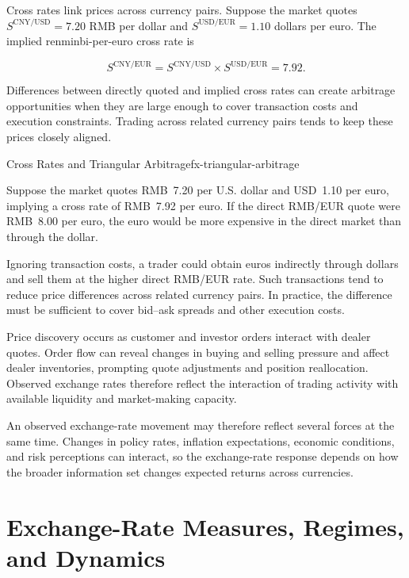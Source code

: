 Cross rates link prices across currency pairs. Suppose the market quotes $S^{\mathrm{CNY/USD}}=7.20$ RMB per dollar and $S^{\mathrm{USD/EUR}}=1.10$ dollars per euro. The implied renminbi-per-euro cross rate is

\begin{equation*}
S^{\mathrm{CNY/EUR}}
=S^{\mathrm{CNY/USD}}\times
S^{\mathrm{USD/EUR}}
=7.92.
\label{eq:ch10-cross-rate}
\end{equation*}

Differences between directly quoted and implied cross rates can create arbitrage opportunities when they are large enough to cover transaction costs and execution constraints. Trading across related currency pairs tends to keep these prices closely aligned.

\begin{example}{Cross Rates and Triangular Arbitrage}{fx-triangular-arbitrage}

Suppose the market quotes RMB~7.20 per U.S. dollar and USD~1.10 per euro, implying a cross rate of RMB~7.92 per euro. If the direct RMB/EUR quote were RMB~8.00 per euro, the euro would be more expensive in the direct market than through the dollar.

Ignoring transaction costs, a trader could obtain euros indirectly through dollars and sell them at the higher direct RMB/EUR rate. Such transactions tend to reduce price differences across related currency pairs. In practice, the difference must be sufficient to cover bid--ask spreads and other execution costs.

\end{example}

Price discovery occurs as customer and investor
orders interact with dealer quotes. Order flow can
reveal changes in buying and selling pressure and
affect dealer inventories, prompting quote adjustments
and position reallocation. Observed exchange rates
therefore reflect the interaction of trading activity
with available liquidity and market-making capacity.

An observed exchange-rate movement may therefore reflect several forces at the same time. Changes in policy rates, inflation expectations, economic conditions, and risk perceptions can interact, so the exchange-rate response depends on how the broader information set changes expected returns across currencies.


\section{Exchange-Rate Measures, Regimes, and Dynamics}

